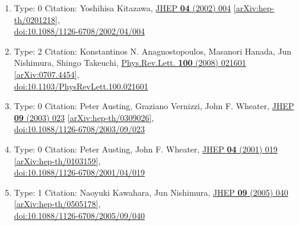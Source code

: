 \documentclass[a4paper,10pt]{article}
\begin{document}
\begin{enumerate}
\begin{enumerate}
  \item Type: 0 Citation: Yoshihisa Kitazawa, \href{https://www.doi.org/10.1088/1126-6708/2002/04/004}{JHEP {\bf 04} (2002) 004}  \href{https://arxiv.org/abs/hep-th/0201218}{[arXiv:hep-th/0201218]},\\\href{https://www.doi.org/10.1088/1126-6708/2002/04/004}{doi:10.1088/1126-6708/2002/04/004}
  \item Type: 2 Citation: Konstantinos N. Anagnostopoulos, Masanori Hanada, Jun Nishimura, Shingo Takeuchi, \href{https://www.doi.org/10.1103/PhysRevLett.100.021601}{Phys.Rev.Lett. {\bf 100} (2008) 021601}  \href{https://arxiv.org/abs/0707.4454}{[arXiv:0707.4454]},\\\href{https://www.doi.org/10.1103/PhysRevLett.100.021601}{doi:10.1103/PhysRevLett.100.021601}
  \item Type: 0 Citation: Peter Austing, Graziano Vernizzi, John F. Wheater, \href{https://www.doi.org/10.1088/1126-6708/2003/09/023}{JHEP {\bf 09} (2003) 023}  \href{https://arxiv.org/abs/hep-th/0309026}{[arXiv:hep-th/0309026]},\\\href{https://www.doi.org/10.1088/1126-6708/2003/09/023}{doi:10.1088/1126-6708/2003/09/023}
  \item Type: 0 Citation: Peter Austing, John F. Wheater, \href{https://www.doi.org/10.1088/1126-6708/2001/04/019}{JHEP {\bf 04} (2001) 019}  \href{https://arxiv.org/abs/hep-th/0103159}{[arXiv:hep-th/0103159]},\\\href{https://www.doi.org/10.1088/1126-6708/2001/04/019}{doi:10.1088/1126-6708/2001/04/019}
  \item Type: 1 Citation: Naoyuki Kawahara, Jun Nishimura, \href{https://www.doi.org/10.1088/1126-6708/2005/09/040}{JHEP {\bf 09} (2005) 040}  \href{https://arxiv.org/abs/hep-th/0505178}{[arXiv:hep-th/0505178]},\\\href{https://www.doi.org/10.1088/1126-6708/2005/09/040}{doi:10.1088/1126-6708/2005/09/040}

\end{enumerate}
\end{enumerate}
\end{document}
